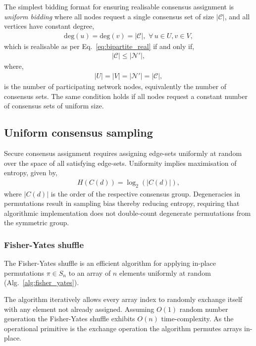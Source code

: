The simplest bidding format for ensuring realisable consensus assignment is \emph{uniform bidding} where all nodes request a single consensus set of size $|\mathcal{C}|$, and all vertices have constant degree,
\begin{align}
	\mathrm{deg}(u) = \mathrm{deg}(v)= |\mathcal{C}|,\,\,\forall\, u\in U, v\in V,
\end{align}
which is realisable as per Eq.~\eqref{eq:bipartite_real} if and only if,
\begin{align}
	|\mathcal{C}| \leq |\mathcal{N}'|,
\end{align}
where,
\begin{align}
	|U|=|V|=|\mathcal{N}'|=|\mathcal{C}|,
\end{align}
is the number of participating network nodes, equivalently the number of consensus sets. The same condition holds if all nodes request a constant number of consensus sets of uniform size.

\subsection{Uniform consensus sampling} \label{sec:uniform_consensus_samp}

Secure consensus assignment requires assigning edge-sets uniformly at random over the space of all satisfying edge-sets. Uniformity implies maximisation of entropy, given by,
\begin{align}
	H(C(d)) = \log_2(|C(d)|),
\end{align}
where $|C(d)|$ is the order of the respective consensus group. Degeneracies in permutations result in sampling bias thereby reducing entropy, requiring that algorithmic implementation does not double-count degenerate permutations from the symmetric group.

\subsubsection{Fisher-Yates shuffle}

The Fisher-Yates shuffle \cite{FisherYates53} is an efficient algorithm for applying in-place permutations $\pi\in S_n$ to an array of $n$ elements uniformly at random (Alg.~\ref{alg:fisher_yates}).

The algorithm iteratively allows every array index to randomly exchange itself with any element not already assigned. Assuming $O(1)$ random number generation the Fisher-Yates shuffle exhibits $O(n)$ time-complexity. As the operational primitive is the exchange operation the algorithm permutes arrays in-place.

